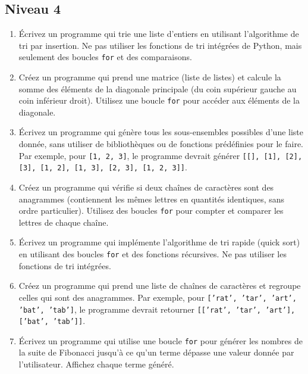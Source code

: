 

\subsection{Niveau 4}

\begin{enumerate}

    \item Écrivez un programme qui trie une liste d'entiers en utilisant l'algorithme de tri par insertion. Ne pas utiliser les fonctions de tri intégrées de Python, mais seulement des boucles \texttt{for} et des comparaisons.

    \item    Créez un programme qui prend une matrice (liste de listes) et calcule la somme des éléments de la diagonale principale (du coin supérieur gauche au coin inférieur droit). Utilisez une boucle \texttt{for} pour accéder aux éléments de la diagonale.

    \item Écrivez un programme qui génère tous les sous-ensembles possibles d'une liste donnée, sans utiliser de bibliothèques ou de fonctions prédéfinies pour le faire. Par exemple, pour \texttt{[1, 2, 3]}, le programme devrait générer \texttt{[[], [1], [2], [3], [1, 2], [1, 3], [2, 3], [1, 2, 3]]}.

    \item Créez un programme qui vérifie si deux chaînes de caractères sont des anagrammes (contiennent les mêmes lettres en quantités identiques, sans ordre particulier). Utilisez des boucles \texttt{for} pour compter et comparer les lettres de chaque chaîne.

    \item Écrivez un programme qui implémente l'algorithme de tri rapide (quick sort) en utilisant des boucles \texttt{for} et des fonctions récursives. Ne pas utiliser les fonctions de tri intégrées.

    \item Créez un programme qui prend une liste de chaînes de caractères et regroupe celles qui sont des anagrammes. Par exemple, pour \texttt{['rat', 'tar', 'art', 'bat', 'tab']}, le programme devrait retourner \texttt{[['rat', 'tar', 'art'], ['bat', 'tab']]}.

    \item Écrivez un programme qui utilise une boucle \texttt{for} pour générer les nombres de la suite de Fibonacci jusqu'à ce qu'un terme dépasse une valeur donnée par l'utilisateur. Affichez chaque terme généré.


\end{enumerate}
